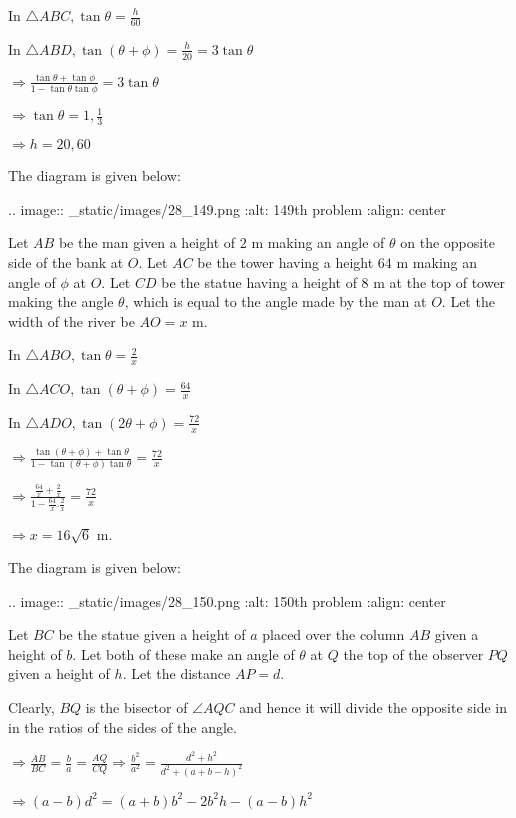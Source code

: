   In $\triangle ABC, \tan\theta = \frac{h}{60}$

  In $\triangle ABD, \tan(\theta + \phi) = \frac{h}{20} = 3\tan\theta$

  $\Rightarrow \frac{\tan\theta + \tan\phi}{1 - \tan\theta\tan\phi} = 3\tan\theta$

  $\Rightarrow \tan\theta = 1, \frac{1}{3}$

  $\Rightarrow h = 20, 60$

\item The diagram is given below:

  .. image:: _static/images/28_149.png
  :alt: 149th problem
  :align: center

  Let $AB$ be the man given a height of $2$ m making an angle of $\theta$ on the
  opposite side of the bank at $O$. Let $AC$ be the tower having a height $64$ m
  making an angle of $\phi$ at $O$. Let $CD$ be the statue having a height of $8$
  m at the top of tower making the angle $\theta$, which is equal to the angle made by the man at
  $O$. Let the width of the river be $AO = x$ m.

  In $\triangle ABO, \tan\theta = \frac{2}{x}$

  In $\triangle ACO, \tan(\theta + \phi) = \frac{64}{x}$

  In $\triangle ADO, \tan(2\theta + \phi) = \frac{72}{x}$

  $\Rightarrow \frac{\tan(\theta + \phi) + \tan\theta}{1 - \tan(\theta + \phi)\tan\theta} =
  \frac{72}{x}$

  $\Rightarrow \frac{\frac{64}{x} + \frac{2}{x}}{1 - \frac{64}{x}.\frac{2}{x}} = \frac{72}{x}$

  $\Rightarrow x = 16\sqrt{6}$ m.

\item The diagram is given below:

  .. image:: _static/images/28_150.png
  :alt: 150th problem
  :align: center

  Let $BC$ be the statue given a height of $a$ placed over the column $AB$ given a
  height of $b$. Let both of these make an angle of $\theta$ at $Q$ the top of the
  observer $PQ$ given a height of $h$. Let the distance $AP = d$.

  Clearly, $BQ$ is the bisector of $\angle AQC$ and hence it will divide the opposite side in
  in the ratios of the sides of the angle.

  $\Rightarrow \frac{AB}{BC} = \frac{b}{a} = \frac{AQ}{CQ} \Rightarrow \frac{b^2}{a^2} =
  \frac{d^2 + h^2}{d^2 + (a + b - h)^2}$

  $\Rightarrow (a - b)d^2 = (a + b)b^2 - 2b^2h - (a - b)h^2$
\stopitemize
